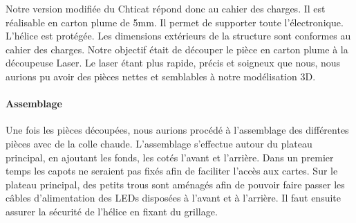 				Notre version modifiée du Chticat répond donc au cahier des charges. Il est réalisable en carton plume de 5mm. Il permet de supporter toute l'électronique. L'hélice est protégée. Les dimensions extérieurs de la structure sont conformes au cahier des charges.
				Notre objectif était de découper le pièce en carton plume à la découpeuse Laser. Le laser étant plus rapide, précis et soigneux que nous, nous aurions pu avoir des pièces nettes et semblables à notre modélisation 3D.
				\paragraph{Assemblage} Une fois les pièces découpées, nous aurions procédé à l'assemblage des différentes pièces avec de la colle chaude. L'assemblage s'effectue autour du plateau principal, en ajoutant les fonds, les cotés l'avant et l'arrière. Dans un premier temps les capots ne seraient pas fixés afin de faciliter l'accès aux cartes. Sur le plateau principal, des petits trous sont aménagés afin de pouvoir faire passer les câbles d'alimentation des LEDs disposées à l'avant et à l'arrière. Il faut ensuite assurer la sécurité de l'hélice en fixant du grillage.